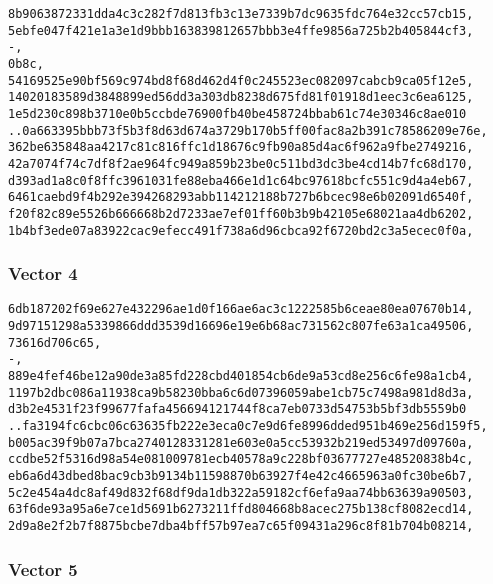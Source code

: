 \documentclass[
]{article}
\begin{document}
\begin{verbatim}
8b9063872331dda4c3c282f7d813fb3c13e7339b7dc9635fdc764e32cc57cb15,
5ebfe047f421e1a3e1d9bbb163839812657bbb3e4ffe9856a725b2b405844cf3,
-,
0b8c,
54169525e90bf569c974bd8f68d462d4f0c245523ec082097cabcb9ca05f12e5,
14020183589d3848899ed56dd3a303db8238d675fd81f01918d1eec3c6ea6125,
1e5d230c898b3710e0b5ccbde76900fb40be458724bbab61c74e30346c8ae010
..0a663395bbb73f5b3f8d63d674a3729b170b5ff00fac8a2b391c78586209e76e,
362be635848aa4217c81c816ffc1d18676c9fb90a85d4ac6f962a9fbe2749216,
42a7074f74c7df8f2ae964fc949a859b23be0c511bd3dc3be4cd14b7fc68d170,
d393ad1a8c0f8ffc3961031fe88eba466e1d1c64bc97618bcfc551c9d4a4eb67,
6461caebd9f4b292e394268293abb114212188b727b6bcec98e6b02091d6540f,
f20f82c89e5526b666668b2d7233ae7ef01ff60b3b9b42105e68021aa4db6202,
1b4bf3ede07a83922cac9efecc491f738a6d96cbca92f6720bd2c3a5ecec0f0a,
\end{verbatim}

\hypertarget{vector-4-1}{%
\subsubsection{Vector 4}\label{vector-4-1}}

\begin{verbatim}
6db187202f69e627e432296ae1d0f166ae6ac3c1222585b6ceae80ea07670b14,
9d97151298a5339866ddd3539d16696e19e6b68ac731562c807fe63a1ca49506,
73616d706c65,
-,
889e4fef46be12a90de3a85fd228cbd401854cb6de9a53cd8e256c6fe98a1cb4,
1197b2dbc086a11938ca9b58230bba6c6d07396059abe1cb75c7498a981d8d3a,
d3b2e4531f23f99677fafa456694121744f8ca7eb0733d54753b5bf3db5559b0
..fa3194fc6cbc06c63635fb222e3eca0c7e9d6fe8996dded951b469e256d159f5,
b005ac39f9b07a7bca2740128331281e603e0a5cc53932b219ed53497d09760a,
ccdbe52f5316d98a54e081009781ecb40578a9c228bf03677727e48520838b4c,
eb6a6d43dbed8bac9cb3b9134b11598870b63927f4e42c4665963a0fc30be6b7,
5c2e454a4dc8af49d832f68df9da1db322a59182cf6efa9aa74bb63639a90503,
63f6de93a95a6e7ce1d5691b6273211ffd804668b8acec275b138cf8082ecd14,
2d9a8e2f2b7f8875bcbe7dba4bff57b97ea7c65f09431a296c8f81b704b08214,
\end{verbatim}

\hypertarget{vector-5-1}{%
\subsubsection{Vector 5}\label{vector-5-1}}
\end{document}
